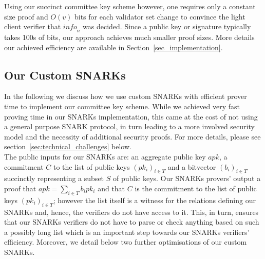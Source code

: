 \noindent Using our succinct committee key scheme however, one requires only a constant size proof and $O(v)$ bits for each validator set change to convince 
the light client verifier that $\mathit{info}_n$ was decided. Since a public key or signature typically takes 100s of bits, our approach 
achieves much smaller proof sizes. More details our achieved efficiency are available in Section~\ref{sec_implementation}.

\subsection{Our Custom SNARKs}

\noindent In the following we discuss how we use custom SNARKs with efficient prover time to implement our committee key scheme. 
While we achieved very fast proving time in our SNARKs implementation, this came at the cost of not using a general purpose SNARK 
protocol, in turn leading to a more involved security model and the necessity of additional security proofs. For more details, please see 
section~\ref{sec:technical_challenges} below. \\

\noindent The public inputs for our SNARKs are: an aggregate public key $\mathit{apk}$, a commitment $C$ to the list of 
public keys $(pk_i)_{i \in T}$ and a bitvector $(b_i)_{i \in T}$ succinctly representing a subset $S$ of public keys. 
Our SNARKs provers' output a proof that $apk=\sum_{i \in T} b_i pk_i$ and that $C$ is the commitment to the list of public keys 
$(pk_i)_{i \in T}$; however the list itself is a witness for the relations defining our SNARKs and, hence, the verifiers do not have access to it. 
This, in turn, ensures that our SNARKs verifiers do not have to parse or check anything based on such a possibly long list which is 
an important step towards our SNARKs verifiers' efficiency. Moreover, we detail below two further optimisations of our custom SNARKs.

